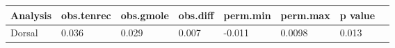 \begin{tabular}[t]{l l l l l l l l }		
\hline
Analysis & obs.tenrec & obs.gmole & obs.diff & perm.min & perm.max & p value \\
\hline
Dorsal & 0.036 & 0.029 & 0.007 & -0.011 & 0.0098 &  0.013 \\
\hline
\end{tabular}
